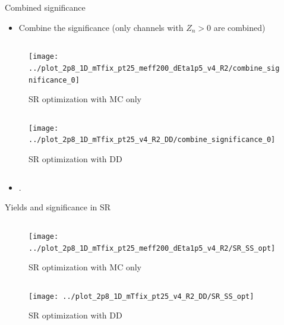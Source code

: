 \documentclass[mathserif,serif]{beamer}
\begin{document}
\begin{frame}{Combined significance}
\tiny
\begin{itemize}
\item Combine the significance (only channels with $Z_n>0$ are combined)
\end{itemize}

\begin{columns}

\begin{column}{0.4\textwidth}
\begin{figure}
\texttt{[image: ../plot\_2p8\_1D\_mTfix\_pt25\_meff200\_dEta1p5\_v4\_R2/combine\_significance\_0]}
\caption{\tiny SR optimization with MC only}
\end{figure}
\end{column}

\end{columns}

\begin{columns}

\begin{column}{0.4\textwidth}
\begin{figure}
\texttt{[image: ../plot\_2p8\_1D\_mTfix\_pt25\_v4\_R2\_DD/combine\_significance\_0]}
\caption{\tiny SR optimization with DD}
\end{figure}
\end{column}

\end{columns}

\begin{itemize}
\item .
\end{itemize}
\end{frame}

\begin{frame}{Yields and significance in SR}
\begin{columns}

\begin{column}{0.4\textwidth}
\begin{figure}
\texttt{[image: ../plot\_2p8\_1D\_mTfix\_pt25\_meff200\_dEta1p5\_v4\_R2/SR\_SS\_opt]}
\caption{\tiny SR optimization with MC only}
\end{figure}
\end{column}

\end{columns}

\begin{columns}

\begin{column}{0.4\textwidth}
\begin{figure}
\texttt{[image: ../plot\_2p8\_1D\_mTfix\_pt25\_v4\_R2\_DD/SR\_SS\_opt]}
\caption{\tiny SR optimization with DD}
\end{figure}
\end{column}

\end{columns}

\end{frame}
\end{document}
